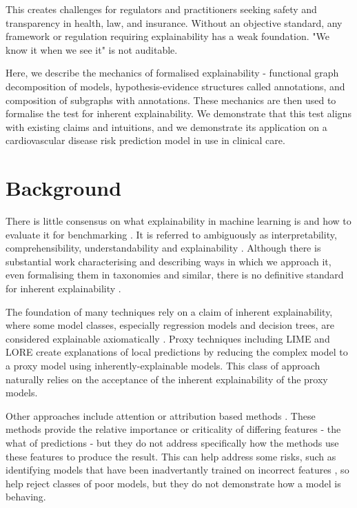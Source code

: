 \documentclass{article}
\begin{document}
This creates challenges for regulators and practitioners seeking safety and transparency in health, law, and insurance. Without an objective standard, any framework or regulation requiring explainability has a weak foundation. "We know it when we see it" is not auditable.

Here, we describe the mechanics of formalised explainability - functional graph decomposition of models, hypothesis-evidence structures called annotations, and composition of subgraphs with annotations. These mechanics are then used to formalise the test for inherent explainability. We demonstrate that this test aligns with existing claims and intuitions, and we demonstrate its application on a cardiovascular disease risk prediction model in use in clinical care.

\section{Background}

There is little consensus on what explainability in machine learning is and how to evaluate it for benchmarking \cite{doshi2017towards}. It is referred to ambiguously as interpretability, comprehensibility, understandability and explainability \cite{guidotti2018survey}. Although there is substantial work characterising and describing ways in which we approach it, even formalising them in taxonomies and similar, there is no definitive standard for inherent explainability \cite{doshi2017towards,adadi2018peeking,guidotti2018local,guidotti2018survey,ribeiro2018anchors,holzinger2017medical,samek2017explainable,lacave2002review}. 

The foundation of many techniques rely on a claim of inherent explainability, where some model classes, especially regression models and decision trees, are considered explainable axiomatically \cite{doshi2017towards}. Proxy techniques including LIME \cite{ribeiro2016why} and LORE \cite{guidotti2018local} create explanations of local predictions by reducing the complex model to a proxy model using inherently-explainable models. This class of approach naturally relies on the acceptance of the inherent explainability of the proxy models.

Other approaches include attention \cite{vaswani2017attention} or attribution based methods \cite{sundararajan2017axiomatic}. These methods provide the relative importance or criticality of differing features - the what of predictions - but they do not address specifically how the methods use these features to produce the result. This can help address some risks, such as identifying models that have been inadvertantly trained on incorrect features \cite{degrave2021ai}, so help reject classes of poor models, but they do not demonstrate how a model is behaving.
\end{document}
